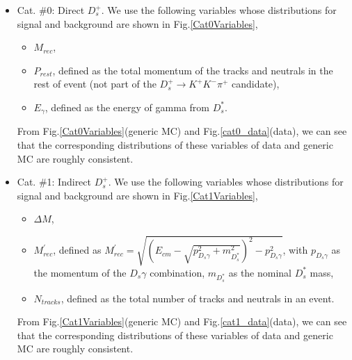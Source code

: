 \begin{itemize}
    \item Cat. \#0: Direct $D_{s}^{+}$. We use the following variables whose distributions for signal and background are shown in Fig.\ref{Cat0Variables},
        \begin{itemize}
            \item[1. ] $M_{rec}$,
            \item[2. ] $P_{rest}$, defined as the total momentum of the tracks and neutrals in the rest of event (not part of the $D_{s}^{+} \rightarrow K^{+}K^{-}\pi^{+}$ candidate),
            \item[3. ] $E_{\gamma}$, defined as the energy of gamma from $D_{s}^{*}$.
        \end{itemize}
        From Fig.\ref{Cat0Variables}(generic MC) and Fig.\ref{cat0_data}(data), we can see that the corresponding distributions of these variables of data and generic MC are roughly consistent.
        

    \item Cat. \#1: Indirect $D_{s}^{+}$.
        We use the following variables whose distributions for signal and background are shown in Fig.\ref{Cat1Variables},
        \begin{itemize}
            \item[1. ] $\Delta{M}$,
            \item[2. ] $M_{rec}^{'}$, defined as $M_{rec}^{'} = \sqrt{ {(E_{cm}  - \sqrt{p_{D_{s}\gamma}^{2} + m_{D_{s}^{*}}^{2}}) }^{2} - p_{D_{s}\gamma}^{2}}$, with $p_{D_{s}\gamma}$ as the momentum of the $D_{s}\gamma$ combination, $m_{D_{s}^{*}}$ as the nominal ${D_{s}^{*}}$ mass,
            \item[3. ] $N_{tracks}$, defined as the total number of tracks and neutrals in an event.
        \end{itemize}
        From Fig.\ref{Cat1Variables}(generic MC) and Fig.\ref{cat1_data}(data), we can see that the corresponding distributions of these variables of data and generic MC are roughly consistent.
\end{itemize}



